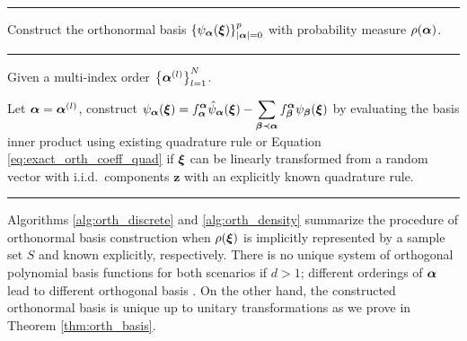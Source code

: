 \begin{algorithm}[htp]
  \hrule
  \caption{Construct the orthonormal  basis $\left\{ \psi_{\bm\alpha}(\bm\xi)\right\}_{\vert \bm\alpha \vert = 0}^p$ with probability measure $\rho(\bm\alpha)$.}
  \vspace{5pt} \hrule \vspace{5pt}
  \begin{algorithmic}[1]
    \State Given a multi-index order $\left\{\bm\alpha^{(l)}\right\}_{l=1}^N$.
 
    \State Let $\bm\alpha = \bm\alpha^{(l)}$, construct $\displaystyle \psi_{\bm{\alpha}}(\bm\xi) = f_{\bm{\alpha}}^{\bm{\alpha}} \hat{\psi}_{\bm\alpha}(\bm\xi) - \mathop{\sum}_{\bm{\beta} \prec \bm{\alpha}} f_{\bm{\beta}}^{\bm{\alpha}} \psi_{\bm{\beta}}(\bm\xi)$ by evaluating the basis inner product using existing quadrature rule or Equation \eqref{eq:exact_orth_coeff_quad} if $\bm\xi$ can be linearly transformed from {\color{blue} a  random vector with i.i.d.\ components} $\bm z$  with an explicitly known quadrature rule.
    \ENDFOR
    \end{algorithmic} 
   \hrule
  \label{alg:orth_density}
\end{algorithm}
Algorithms \ref{alg:orth_discrete} and \ref{alg:orth_density} summarize the procedure of orthonormal basis construction when $\rho(\bm\xi)$ is implicitly represented by a sample set $S$ and known explicitly, respectively.
There is no unique system of orthogonal polynomial basis functions for both scenarios if $d > 1$; different orderings of $\bm\alpha$ lead to different orthogonal basis \cite{dunkl_xu_2014}.
On the other hand, the constructed orthonormal basis is unique up to unitary transformations as we prove in Theorem \ref{thm:orth_basis}.


